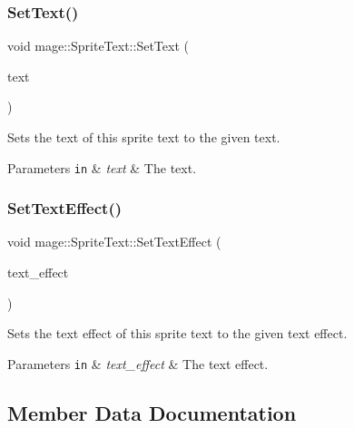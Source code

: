 \subsubsection{\texorpdfstring{Set\+Text()}{SetText()}}
{\footnotesize\ttfamily void mage\+::\+Sprite\+Text\+::\+Set\+Text (\begin{DoxyParamCaption}\item[{\hyperlink{classmage_1_1_color_string}{Color\+String}}]{text }\end{DoxyParamCaption})}

Sets the text of this sprite text to the given text.


\begin{DoxyParams}[1]{Parameters}
\mbox{\tt in}  & {\em text} & The text. \\
\hline
\end{DoxyParams}
\hypertarget{classmage_1_1_sprite_text_ae258a31796c3fa6b8c31e0b98010a0ef}{}\label{classmage_1_1_sprite_text_ae258a31796c3fa6b8c31e0b98010a0ef} 
\subsubsection{\texorpdfstring{Set\+Text\+Effect()}{SetTextEffect()}}
{\footnotesize\ttfamily void mage\+::\+Sprite\+Text\+::\+Set\+Text\+Effect (\begin{DoxyParamCaption}\item[{\hyperlink{classmage_1_1_sprite_text_a4d3101d037b6fe4247d77b5fbf811dd2}{Text\+Effect}}]{text\+\_\+effect }\end{DoxyParamCaption})\hspace{0.3cm}{\ttfamily [noexcept]}}

Sets the text effect of this sprite text to the given text effect.


\begin{DoxyParams}[1]{Parameters}
\mbox{\tt in}  & {\em text\+\_\+effect} & The text effect. \\
\hline
\end{DoxyParams}


\subsection{Member Data Documentation}
\hypertarget{classmage_1_1_sprite_text_a7d5f122cd5a87e47786796e41dbf6b71}{}\label{classmage_1_1_sprite_text_a7d5f122cd5a87e47786796e41dbf6b71} 

